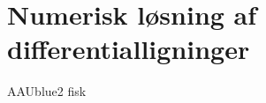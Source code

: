 \chapter{Numerisk løsning af differentialligninger}
%
\begin{color}{AAUblue2}
%
fisk
% 
\end{color}



